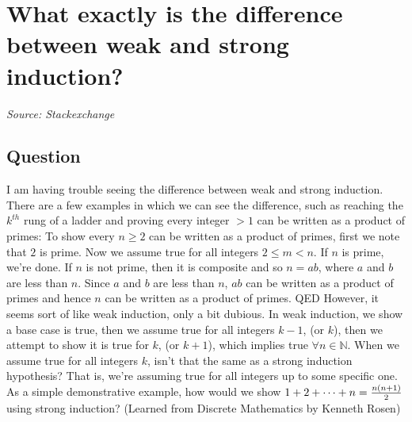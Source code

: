 \documentclass{article}
\begin{document}
\newpage

\section{What exactly is the difference between weak and strong induction?}
\textit{Source: Stackexchange}

\subsection*{Question}
I am having trouble seeing the difference between weak and strong induction. There are a few examples in which we can see the difference, such as reaching the $k^{th}$ rung of a ladder and proving every integer $>1$ can be written as a product of primes: To show every $n\ge2$ can be written as a product of primes, first we note that $2$ is prime. Now we assume true for all integers $2 \le m<n$. If $n$ is prime, we're done. If $n$ is not prime, then it is composite and so $n=ab$, where $a$ and $b$ are less than $n$. Since $a$ and $b$ are less than $n$, $ab$ can be written as a product of primes and hence $n$ can be written as a product of primes. QED However, it seems sort of like weak induction, only a bit dubious. In weak induction, we show a base case is true, then we assume true for all integers $k-1$, (or $k$), then we attempt to show it is true for $k$, (or $k+1$), which implies true $\forall n \in \mathbb N$. When we assume true for all integers $k$, isn't that the same as a strong induction hypothesis? That is, we're assuming true for all integers up to some specific one. As a simple demonstrative example, how would we show $1+2+\cdots+n= {n(n+1) \over 2}$ using strong induction? (Learned from Discrete Mathematics by Kenneth Rosen)
\end{document}
